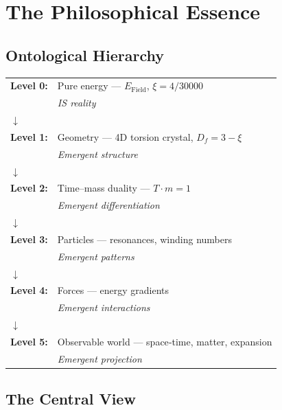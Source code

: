 	\section{The Philosophical Essence}
	
	\subsection{Ontological Hierarchy}
	
	\begin{center}
		\begin{tabular}{ll}
			\textbf{Level 0:} & Pure energy — $E_{\text{Field}}$, $\xi = 4/30000$ \\
			& \textit{IS reality} \\[0.3cm]
			$\downarrow$ & \\[0.3cm]
			\textbf{Level 1:} & Geometry — 4D torsion crystal, $D_f = 3-\xi$ \\
			& \textit{Emergent structure} \\[0.3cm]
			$\downarrow$ & \\[0.3cm]
			\textbf{Level 2:} & Time–mass duality — $T \cdot m = 1$ \\
			& \textit{Emergent differentiation} \\[0.3cm]
			$\downarrow$ & \\[0.3cm]
			\textbf{Level 3:} & Particles — resonances, winding numbers \\
			& \textit{Emergent patterns} \\[0.3cm]
			$\downarrow$ & \\[0.3cm]
			\textbf{Level 4:} & Forces — energy gradients \\
			& \textit{Emergent interactions} \\[0.3cm]
			$\downarrow$ & \\[0.3cm]
			\textbf{Level 5:} & Observable world — space‑time, matter, expansion \\
			& \textit{Emergent projection} \\
		\end{tabular}
	\end{center}
	
	\subsection{The Central View}
	
